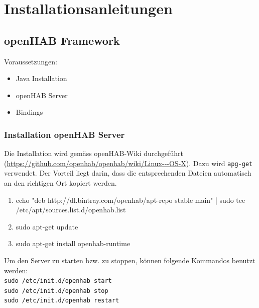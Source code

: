 \chapter{Installationsanleitungen} \label{ch:manual}

\section*{openHAB Framework}
Voraussetzungen:
\begin{itemize}
	\item Java Installation
	\item openHAB Server
	\item Bindings
\end{itemize}

\subsection*{Installation openHAB Server}
Die Installation wird gemäss openHAB-Wiki durchgeführt (\url{https://github.com/openhab/openhab/wiki/Linux---OS-X}). Dazu wird \lstinline!apg-get! verwendet. Der Vorteil liegt darin, dass die entsprechenden Dateien automatisch an den richtigen Ort kopiert werden.
\begin{enumerate}
	\item echo "deb http://dl.bintray.com/openhab/apt-repo stable main" | sudo tee /etc/apt/sources.list.d/openhab.list
	\item sudo apt-get update
	\item sudo apt-get install openhab-runtime
\end{enumerate}
Um den Server zu starten bzw. zu stoppen, können folgende Kommandos benutzt werden: \\
\lstinline!sudo /etc/init.d/openhab start!\\
\lstinline!sudo /etc/init.d/openhab stop! \\
\lstinline!sudo /etc/init.d/openhab restart!

